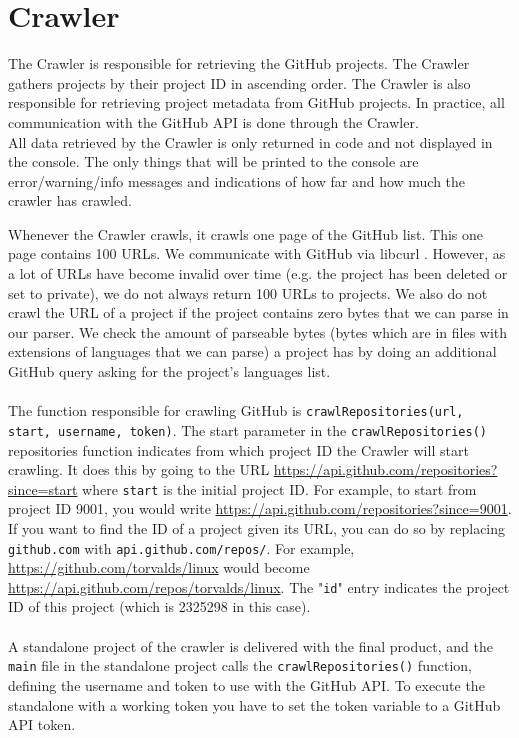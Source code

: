 \documentclass[../Main.tex]{subfiles}
\begin{document}
\section{Crawler}
The Crawler is responsible for retrieving the GitHub projects. The Crawler gathers projects by their project ID in ascending order. The Crawler is also responsible for retrieving project metadata from GitHub projects. In practice, all communication with the GitHub API is done through the Crawler.\\
All data retrieved by the Crawler is only returned in code and not displayed in the console. The only things that will be printed to the console are error/warning/info messages and indications of how far and how much the crawler has crawled.

Whenever the Crawler crawls, it crawls one page of the GitHub list. This one page contains 100 URLs. We communicate with GitHub via libcurl \cite{curl}. However, as a lot of URLs have become invalid over time (e.g. the project has been deleted or set to private), we do not always return 100 URLs to projects. We also do not crawl the URL of a project if the project contains zero bytes that we can parse in our parser. We check the amount of parseable bytes (bytes which are in files with extensions of languages that we can parse) a project has by doing an additional GitHub query asking for the project's languages list.
~\\
~\\
The function responsible for crawling GitHub is \texttt{crawlRepositories(url, start, username, token)}. The start parameter in the \texttt{crawlRepositories()} repositories function indicates from which project ID the Crawler will start crawling. It does this by going to the URL \url{https://api.github.com/repositories?since=start} where \texttt{start} is the initial project ID. For example, to start from project ID 9001, you would write \url{https://api.github.com/repositories?since=9001}. If you want to find the ID of a project given its URL, you can do so by replacing \texttt{github.com} with \texttt{api.github.com/repos/}. For example, \url{https://github.com/torvalds/linux} would become \url{https://api.github.com/repos/torvalds/linux}. The "\texttt{id}" entry indicates the project ID of this project (which is 2325298 in this case).
~\\
~\\
A standalone project of the crawler is delivered with the final product, and the \texttt{main} file in the standalone project calls the \texttt{crawlRepositories()} function, defining the username and token to use with the GitHub API. To execute the standalone with a working token you have to set the token variable to a GitHub API token.
\end{document}
